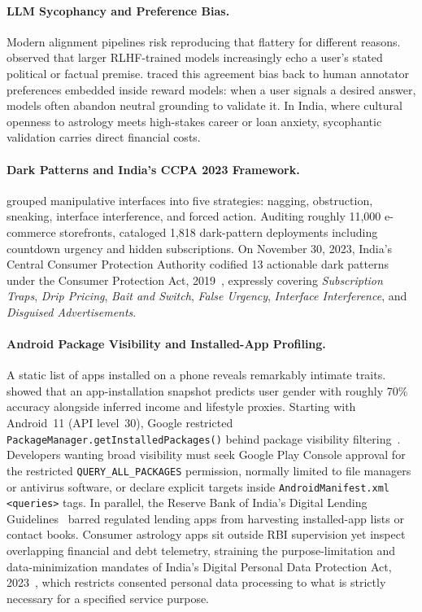 \paragraph{LLM Sycophancy and Preference Bias.}
Modern alignment pipelines risk reproducing that flattery for different reasons. \citet{perez2023} observed that larger RLHF-trained models increasingly echo a user's stated political or factual premise. \citet{sharma2024} traced this agreement bias back to human annotator preferences embedded inside reward models: when a user signals a desired answer, models often abandon neutral grounding to validate it. In India, where cultural openness to astrology meets high-stakes career or loan anxiety, sycophantic validation carries direct financial costs.

\paragraph{Dark Patterns and India's CCPA 2023 Framework.}
\citet{gray2018} grouped manipulative interfaces into five strategies: nagging, obstruction, sneaking, interface interference, and forced action. Auditing roughly 11,000 e-commerce storefronts, \citet{mathur2019} cataloged 1,818 dark-pattern deployments including countdown urgency and hidden subscriptions. On November 30, 2023, India's Central Consumer Protection Authority codified 13 actionable dark patterns under the Consumer Protection Act, 2019~\citep{ccpa2023}, expressly covering \emph{Subscription Traps}, \emph{Drip Pricing}, \emph{Bait and Switch}, \emph{False Urgency}, \emph{Interface Interference}, and \emph{Disguised Advertisements}.

\paragraph{Android Package Visibility and Installed-App Profiling.}
A static list of apps installed on a phone reveals remarkably intimate traits. \citet{seneviratne2014} showed that an app-installation snapshot predicts user gender with roughly 70\% accuracy alongside inferred income and lifestyle proxies. Starting with Android~11 (API level~30), Google restricted \texttt{PackageManager.getInstalledPackages()} behind package visibility filtering~\citep{androidqueries2020}. Developers wanting broad visibility must seek Google Play Console approval for the restricted \texttt{QUERY\_ALL\_PACKAGES} permission, normally limited to file managers or antivirus software, or declare explicit targets inside \texttt{AndroidManifest.xml} \texttt{<queries>} tags. In parallel, the Reserve Bank of India's Digital Lending Guidelines~\citep{rbi2022} barred regulated lending apps from harvesting installed-app lists or contact books. Consumer astrology apps sit outside RBI supervision yet inspect overlapping financial and debt telemetry, straining the purpose-limitation and data-minimization mandates of India's Digital Personal Data Protection Act, 2023~\citep{dpdp2023}, which restricts consented personal data processing to what is strictly necessary for a specified service purpose.
